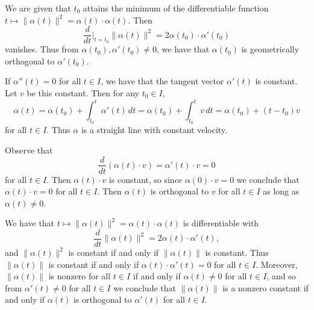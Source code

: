 \begin{ex}
We are given that $t_0$ attains the minimum of the differentiable function $t \mapsto \|\alpha(t)\|^2 = \alpha(t)\cdot\alpha(t)$. Then \[\frac{d}{dt}\bigg|_{t = t_0}\|\alpha(t)\|^2 = 2\alpha(t_0)\cdot\alpha'(t_0)\] vanishes. Thus from $\alpha(t_0), \alpha'(t_0) \not = 0$, we have that $\alpha(t_0)$ is geometrically orthogonal to $\alpha'(t_0)$.
\end{ex}

\begin{ex}
If $\alpha''(t) = 0$ for all $t \in I$, we have that the tangent vector $\alpha'(t)$ is constant. Let $v$ be this constant. Then for any $t_0 \in I$, \[\alpha(t) = \alpha(t_0) + \int_{t_0}^t\alpha'(t)\,dt = \alpha(t_0) + \int_{t_0}^t v\,dt = \alpha(t_0) + (t-t_0)v\] for all $t \in I$. Thus $\alpha$ is a straight line with constant velocity.
\end{ex}

\begin{ex}
Observe that \[\frac{d}{dt}(\alpha(t)\cdot v) = \alpha'(t)\cdot v = 0\] for all $t \in I$. Then $\alpha(t)\cdot v$ is constant, so since $\alpha(0)\cdot v = 0$ we conclude that $\alpha(t)\cdot v = 0$ for all $t \in I$. Then $\alpha(t)$ is orthogonal to $v$ for all $t \in I$ as long as $\alpha(t) \not = 0$.
\end{ex}

\begin{ex}
We have that $t \mapsto \|\alpha(t)\|^2 = \alpha(t)\cdot\alpha(t)$ is differentiable with \[\frac{d}{dt}\|\alpha(t)\|^2 = 2\alpha(t)\cdot\alpha'(t),\] and $\|\alpha(t)\|^2$ is constant if and only if $\|\alpha(t)\|$ is constant. Thus $\|\alpha(t)\|$ is constant if and only if $\alpha(t)\cdot\alpha'(t) = 0$ for all $t \in I$. Moreover, $\|\alpha(t)\|$ is nonzero for all $t \in I$ if and only if $\alpha(t) \not = 0$ for all $t \in I$, and so from $\alpha'(t) \not = 0$ for all $t \in I$ we conclude that $\|\alpha(t)\|$ is a nonzero constant if and only if $\alpha(t)$ is orthogonal to $\alpha'(t)$ for all $t \in I$.
\end{ex}
